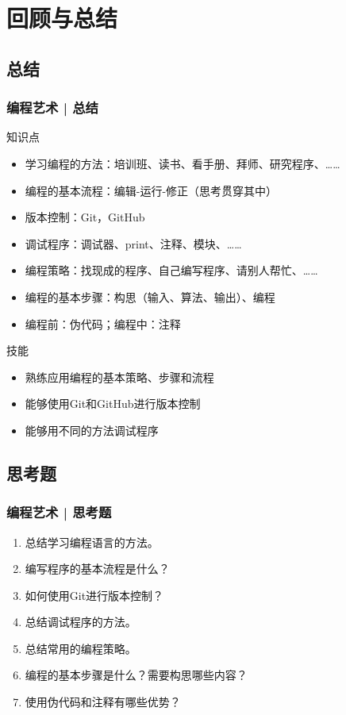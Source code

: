 \section{回顾与总结}
\subsection{总结}
\begin{frame}
  \frametitle{编程艺术 | 总结}
  \begin{block}{知识点}
    \begin{itemize}
      \item 学习编程的方法：培训班、读书、看手册、拜师、研究程序、……
      \item 编程的基本流程：编辑-运行-修正（思考贯穿其中）
      \item 版本控制：Git，GitHub
      \item 调试程序：调试器、print、注释、模块、……
      \item 编程策略：找现成的程序、自己编写程序、请别人帮忙、……
      \item 编程的基本步骤：构思（输入、算法、输出）、编程
      \item 编程前：伪代码；编程中：注释
    \end{itemize}
  \end{block}
  \pause
  \begin{block}{技能}
    \begin{itemize}
      \item 熟练应用编程的基本策略、步骤和流程
      \item 能够使用Git和GitHub进行版本控制
      \item 能够用不同的方法调试程序
    \end{itemize}
  \end{block}
\end{frame}

\subsection{思考题}
\begin{frame}
  \frametitle{编程艺术 | 思考题}
  \begin{enumerate}
    \item 总结学习编程语言的方法。
    \item 编写程序的基本流程是什么？
    \item 如何使用Git进行版本控制？
    \item 总结调试程序的方法。
    \item 总结常用的编程策略。
    \item 编程的基本步骤是什么？需要构思哪些内容？
    \item 使用伪代码和注释有哪些优势？
  \end{enumerate}
\end{frame}

